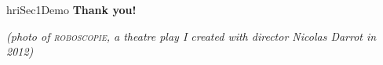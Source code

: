 \documentclass[xcolor=table]{beamer}
\begin{document}
{
    \begin{frame}[plain]

        \begin{columns}
            \begin{column}{0.6\linewidth}
            \end{column}
            \begin{column}{0.4\linewidth}

                \vspace{6em}
                \begin{beamercolorbox}[wd=\linewidth,ht=6ex,dp=0.7ex]{hriSec1Demo}
                    \textbf{Thank you!}
                \end{beamercolorbox}
                \vspace{12em}
                {\scriptsize
                \textcolor{white!60!black}{\emph{(photo of 
                \textsc{roboscopie}, a theatre play I created with director Nicolas Darrot in
                2012)}}
                }
            \end{column}
        \end{columns}
    \end{frame}
}
\end{document}
